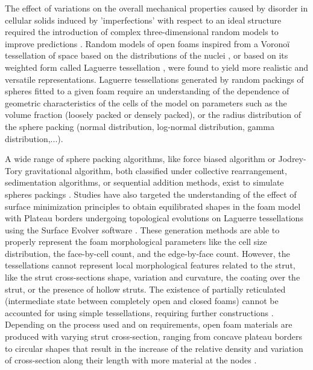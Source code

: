 The effect of variations on the overall mechanical properties caused by disorder in cellular solids induced by 'imperfections' with respect to an ideal structure required the introduction of complex three-dimensional random models to improve predictions \cite{grenestedtInfluenceCellShape1998}. Random models of open foams inspired from a Vorono\"i tessellation of space based on the distributions of the nuclei \cite{vanderburgLinearElasticProperties1997}, or based on its weighted form called Laguerre tessellation \cite{fanSimulationPolycrystallineStructure2004,lautensackFittingThreedimensionalLaguerre2008}, were found to yield more realistic and versatile representations. Laguerre tessellations generated by random packings of spheres fitted to a given foam require an understanding of the dependence of geometric characteristics of the cells of the model on parameters such as the volume fraction (loosely packed or densely packed), or the radius distribution of the sphere packing (normal distribution, log-normal distribution, gamma distribution,...). 

A wide range of sphere packing algorithms, like force biased algorithm or Jodrey-Tory gravitational algorithm, both classified under collective rearrangement, sedimentation algorithms, or sequential addition methods, exist to simulate spheres packings \cite{bezrukovStatisticalAnalysisSimulated2002}. Studies have also targeted the understanding of  the effect of surface minimization principles to obtain equilibrated shapes in the foam model with Plateau borders undergoing topological evolutions on Laguerre tessellations using the Surface Evolver software \cite{kraynikStructureRandomMonodisperse2003,kraynikStructureRandomFoam2004,kraynikStructureRandomFoam2006,vecchioImprovedModelsSolid2016}. These generation methods are able to properly represent the foam morphological parameters like the cell size distribution, the face-by-cell count, and the edge-by-face count. However, the tessellations cannot represent local morphological features related to the strut, like the strut cross-sections shape, variation and curvature, the coating over the strut, or the presence of hollow struts. The existence of partially reticulated (intermediate state between completely open and closed foams) cannot be accounted for using simple tessellations, requiring further constructions \cite{jangMicrostructureOpencellFoams2008}. %
Depending on the process used and on requirements, open foam materials are produced with varying strut cross-section, ranging from concave plateau borders to circular shapes that result in the increase of the relative density and variation of cross-section along their length with more material at the nodes \cite{jangMicrostructureOpencellFoams2008}. 

